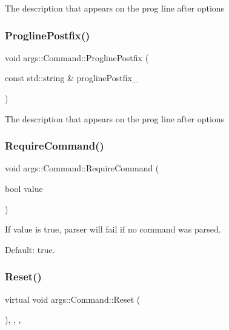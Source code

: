 The description that appears on the prog line after options \mbox{\label{classargs_1_1_command_a806f2aa27383139b85880f42c2de56c6}} 
\subsubsection{\texorpdfstring{Progline\+Postfix()}{ProglinePostfix()}\hspace{0.1cm}{\footnotesize\ttfamily [2/2]}}
{\footnotesize\ttfamily void args\+::\+Command\+::\+Progline\+Postfix (\begin{DoxyParamCaption}\item[{const std\+::string \&}]{progline\+Postfix\+\_\+ }\end{DoxyParamCaption})\hspace{0.3cm}{\ttfamily [inline]}}

The description that appears on the prog line after options \mbox{\label{classargs_1_1_command_afbbca5178a6c712f9ad0777b7bef08bd}} 
\subsubsection{\texorpdfstring{Require\+Command()}{RequireCommand()}}
{\footnotesize\ttfamily void args\+::\+Command\+::\+Require\+Command (\begin{DoxyParamCaption}\item[{bool}]{value }\end{DoxyParamCaption})\hspace{0.3cm}{\ttfamily [inline]}}

If value is true, parser will fail if no command was parsed.

Default\+: true. \mbox{\label{classargs_1_1_command_aa1829501dd4f63ba3551bf85171be83e}} 
\subsubsection{\texorpdfstring{Reset()}{Reset()}}
{\footnotesize\ttfamily virtual void args\+::\+Command\+::\+Reset (\begin{DoxyParamCaption}{ }\end{DoxyParamCaption})\hspace{0.3cm}{\ttfamily [inline]}, {\ttfamily [override]}, {\ttfamily [virtual]}, {\ttfamily [noexcept]}}



